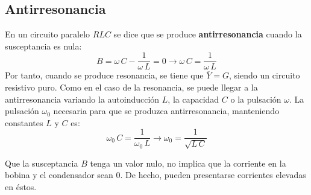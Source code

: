 \subsection{Antirresonancia}
En un circuito paralelo $RLC$ se dice que se produce
\textbf{antirresonancia} cuando la susceptancia es nula:
\begin{equation*}
  B=\omega\,C-\dfrac{1}{\omega\,L}=0\rightarrow \omega\,C=\dfrac{1}{\omega\,L}
\end{equation*}
Por tanto, cuando se produce resonancia, se tiene que
$\overline{Y}=G$, siendo un circuito resistivo puro. Como en el caso
de la resonancia, se puede llegar a la antirresonancia variando la
autoinducción $L$, la capacidad $C$ o la pulsación $\omega$. La
pulsación $\omega_0$ necesaria para que se produzca antirresonancia,
manteniendo constantes $L$ y $C$ es:
\begin{equation}
  \omega_0\,C=\dfrac{1}{\omega_0\,L}\rightarrow \boxed{\omega_0=\dfrac{1}{\sqrt{L\,C}}}
\end{equation}
\begin{remark}
  Que la susceptancia $B$ tenga un valor nulo, no implica que la
  corriente en la bobina y el condensador sean 0. De hecho, pueden
  presentarse corrientes elevadas en éstos.
\end{remark}
	
